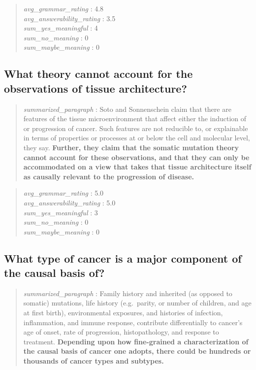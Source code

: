 \begin{quote}
\emph{avg\_grammar\_rating} : 4.8\\
\emph{avg\_answerability\_rating} : 3.5\\
\emph{sum\_yes\_meaningful} : 4\\
\emph{sum\_no\_meaning} : 0\\
\emph{sum\_maybe\_meaning} : 0
\end{quote}

\hypertarget{what-theory-cannot-account-for-the-observations-of-tissue-architecture}{%
\subsection{What theory cannot account for the observations of tissue
architecture?}\label{what-theory-cannot-account-for-the-observations-of-tissue-architecture}}

\begin{quote}
\emph{summarized\_paragraph} : Soto and Sonnenschein claim that there
are features of the tissue microenvironment that affect either the
induction of or progression of cancer. Such features are not reducible
to, or explainable in terms of properties or processes at or below the
cell and molecular level, they say. \textbf{Further, they claim that the
somatic mutation theory cannot account for these observations, and that
they can only be accommodated on a view that takes that tissue
architecture itself as causally relevant to the progression of disease.}
\end{quote}

\begin{quote}
\emph{avg\_grammar\_rating} : 5.0\\
\emph{avg\_answerability\_rating} : 5.0\\
\emph{sum\_yes\_meaningful} : 3\\
\emph{sum\_no\_meaning} : 0\\
\emph{sum\_maybe\_meaning} : 0
\end{quote}

\hypertarget{what-type-of-cancer-is-a-major-component-of-the-causal-basis-of}{%
\subsection{What type of cancer is a major component of the causal basis
of?}\label{what-type-of-cancer-is-a-major-component-of-the-causal-basis-of}}

\begin{quote}
\emph{summarized\_paragraph} : Family history and inherited (as opposed
to somatic) mutations, life history (e.g.~parity, or number of children,
and age at first birth), environmental exposures, and histories of
infection, inflammation, and immune response, contribute differentially
to cancer's age of onset, rate of progression, histopathology, and
response to treatment. \textbf{Depending upon how fine-grained a
characterization of the causal basis of cancer one adopts, there could
be hundreds or thousands of cancer types and subtypes.}
\end{quote}

